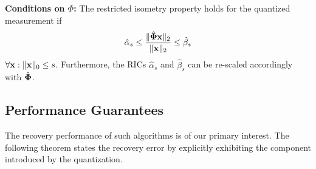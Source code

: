 \documentclass{article}
\begin{document}
 
{\bf Conditions on ${\Phi}$:} The restricted isometry property holds for the quantized measurement if
\begin{equation}
    \hat{\alpha}_{s} \leq \frac{\|\hat{{\bf \Phi}} {\bf x}\|_2}{\|{\bf x}\|_2} \leq \hat{\beta}_{s}
\end{equation}
$\forall {\bf x}: \| {\bf x}\|_0 \leq s$. Furthermore, the RICs $\hat{\alpha}_s$ and $\hat{\beta}_s$ can be re-scaled accordingly with $\hat{\bf \Phi}$.

\subsection{Performance Guarantees}
The recovery performance of such algorithms is of our primary interest. The following theorem states the recovery error by explicitly exhibiting the component introduced by the quantization.
\end{document}
